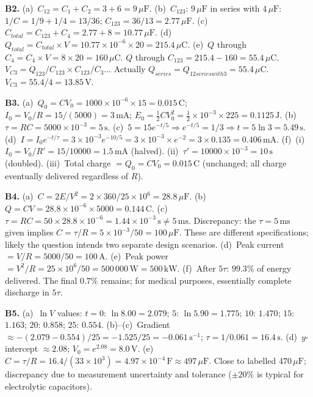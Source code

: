 \textbf{B2.}
(a)~$C_{12}=C_1+C_2=3+6=9\,\mu\text{F}$. \quad
(b)~$C_{123}$: $9\,\mu\text{F}$ in series with
$4\,\mu\text{F}$:
$1/C=1/9+1/4=13/36$; $C_{123}=36/13=2.77\,\mu\text{F}$.
\quad
(c)~$C_{total}=C_{123}+C_4=2.77+8=10.77\,\mu\text{F}$.
\quad
(d)~$Q_{total}=C_{total}\times V=10.77\times10^{-6}
\times20=215.4\,\mu\text{C}$. \quad
(e)~$Q$ through $C_4=C_4\times V=8\times20
=160\,\mu\text{C}$.
$Q$ through $C_{123}=215.4-160=55.4\,\mu\text{C}$.
$V_{C3}=Q_{123}/C_{123}\times C_{123}/C_3$...
Actually $Q_{series}=Q_{12series with 3}=55.4\,\mu\text{C}$.
$V_{C3}=55.4/4=13.85\,\text{V}$.

\textbf{B3.}
(a)~$Q_0=CV_0=1000\times10^{-6}\times15
=0.015\,\text{C}$;
$I_0=V_0/R=15/(5000)=3\,\text{mA}$;
$E_0=\tfrac{1}{2}CV_0^2=\tfrac{1}{2}\times10^{-3}
\times225=0.1125\,\text{J}$. \quad
(b)~$\tau=RC=5000\times10^{-3}=5\,\text{s}$. \quad
(c)~$5=15e^{-t/5}\Rightarrow e^{-t/5}=1/3
\Rightarrow t=5\ln3=5.49\,\text{s}$. \quad
(d)~$I=I_0e^{-t/\tau}=3\times10^{-3}e^{-10/5}
=3\times10^{-3}\times e^{-2}=3\times0.135
=0.406\,\text{mA}$. \quad
(f)~(i)~$I_0=V_0/R'=15/10000=1.5\,\text{mA}$ (halved).
(ii)~$\tau'=10000\times10^{-3}=10\,\text{s}$ (doubled).
(iii)~Total charge $=Q_0=CV_0=0.015\,\text{C}$
(unchanged; all charge eventually delivered regardless
of $R$).

\textbf{B4.}
(a)~$C=2E/V^2=2\times360/25\times10^6
=28.8\,\mu\text{F}$. \quad
(b)~$Q=CV=28.8\times10^{-6}\times5000
=0.144\,\text{C}$. \quad
(c)~$\tau=RC=50\times28.8\times10^{-6}
=1.44\times10^{-3}\,\text{s}\neq5\,\text{ms}$.
Discrepancy: the $\tau=5\,\text{ms}$ given implies
$C=\tau/R=5\times10^{-3}/50=100\,\mu\text{F}$.
These are different specifications; likely the
question intends two separate design scenarios. \quad
(d)~Peak current $=V/R=5000/50=100\,\text{A}$. \quad
(e)~Peak power $=V^2/R=25\times10^6/50
=500\,000\,\text{W}=500\,\text{kW}$. \quad
(f)~After $5\tau$: $99.3\%$ of energy delivered.
The final $0.7\%$ remains; for medical purposes,
essentially complete discharge in $5\tau$.

\textbf{B5.}
(a)~$\ln V$ values:
$t=0$: $\ln8.00=2.079$;
$5$: $\ln5.90=1.775$;
$10$: $1.470$; $15$: $1.163$;
$20$: $0.858$; $25$: $0.554$. \quad
(b)--(c)~Gradient $\approx-(2.079-0.554)/25
=-1.525/25=-0.061\,\text{s}^{-1}$;
$\tau=1/0.061=16.4\,\text{s}$. \quad
(d)~$y$-intercept $\approx2.08$;
$V_0=e^{2.08}=8.0\,\text{V}$. \quad
(e)~$C=\tau/R=16.4/(33\times10^3)=4.97\times10^{-4}
\,\text{F}\approx497\,\mu\text{F}$.
Close to labelled $470\,\mu\text{F}$; discrepancy
due to measurement uncertainty and tolerance
($\pm20\%$ is typical for electrolytic capacitors).

